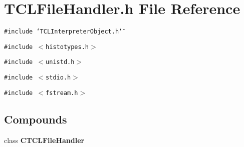 \section{TCLFile\-Handler.h File Reference}
\label{TCLFileHandler_8h}
{\tt \#include \char`\"{}TCLInterpreter\-Object.h\char`\"{}}\par
{\tt \#include $<$histotypes.h$>$}\par
{\tt \#include $<$unistd.h$>$}\par
{\tt \#include $<$stdio.h$>$}\par
{\tt \#include $<$fstream.h$>$}\par
\subsection*{Compounds}
\begin{CompactItemize}
\item 
class {\bf CTCLFile\-Handler}
\end{CompactItemize}
